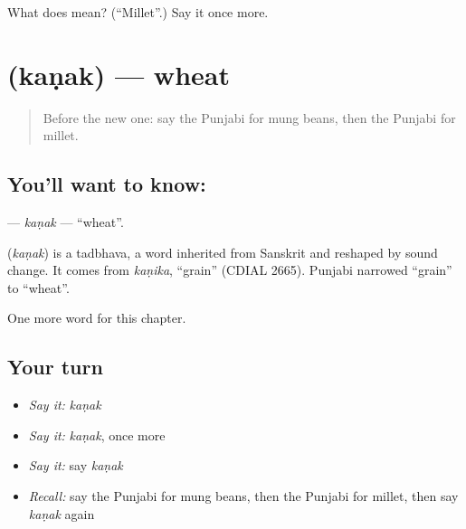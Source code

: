 \begin{tcolorbox}[breakable,colback=teal!4,colframe=teal!35!black,title={Before you move on}]
What does  mean? (\textquotedblleft{}Millet\textquotedblright{}.) Say it once more.
\end{tcolorbox}
\section[\texorpdfstring{\pa{ਕਣਕ} (kaṇak)}{ਕਣਕ (kaṇak)}]{ (kaṇak) — wheat}

\label{lesson:PA-C122-kanak}



\begin{quote}
Before the new one: say the Punjabi for mung beans, then the Punjabi for millet.
\end{quote}

\subsection*{You'll want to know: }
\textbf{} — \emph{kaṇak} — \textquotedblleft{}wheat\textquotedblright{}.

\begin{cousinweb}
\textbf{} (\emph{kaṇak}) is a tadbhava, a word inherited from Sanskrit and reshaped by sound change. It comes from \emph{kaṇika}, \textquotedblleft{}grain\textquotedblright{} (CDIAL 2665). Punjabi narrowed \textquotedblleft{}grain\textquotedblright{} to \textquotedblleft{}wheat\textquotedblright{}.
\end{cousinweb}

\begin{grammarlens}[title={What you've built}]
One more word for this chapter.
\end{grammarlens}

\subsection*{Your turn}
\begin{itemize}
\raggedright
  \item \emph{Say it:} \emph{kaṇak}
  \item \emph{Say it:} \emph{kaṇak}, once more
  \item \emph{Say it:} say \emph{kaṇak}
  \item \emph{Recall:} say the Punjabi for mung beans, then the Punjabi for millet, then say \emph{kaṇak} again
\end{itemize}

